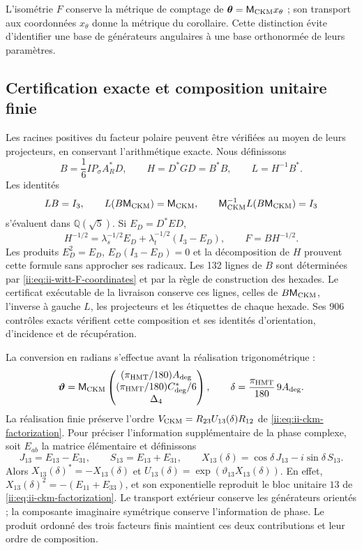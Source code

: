 L’isométrie \(F\) conserve la métrique de comptage de
\(\boldsymbol\theta=\mathsf M_{\rm CKM}x_\theta\) ; son transport
aux coordonnées \(x_\theta\) donne la métrique du corollaire. Cette
distinction évite d’identifier une base de générateurs angulaires à une
base orthonormée de leurs paramètres.

\subsection{Certification exacte et composition unitaire finie}

Les racines positives du facteur polaire peuvent être vérifiées au moyen de leurs
projecteurs, en conservant l’arithmétique exacte. Nous définissons
\begin{equation}
 B=\frac16IP_\sigma A_R^*D,\qquad
 H=D^*GD=B^*B,\qquad L=H^{-1}B^*.
 \label{ii:eq:ii-witt-radical-free}
\end{equation}
Les identités
\[
 LB=I_3,\qquad L(B\mathsf M_{\rm CKM})=\mathsf M_{\rm CKM},\qquad
 \mathsf M_{\rm CKM}^{-1}L(B\mathsf M_{\rm CKM})=I_3
\]
s’évaluent dans \(\mathbb Q(\sqrt5)\). Si \(E_D=D^*ED\),
\[
 H^{-1/2}=\lambda_s^{-1/2}E_D+
          \lambda_t^{-1/2}(I_3-E_D),\qquad F=BH^{-1/2}.
\]
Les produits \(E_D^2=E_D\), \(E_D(I_3-E_D)=0\) et la
décomposition de \(H\) prouvent cette formule sans approcher ses
radicaux. Les 132 lignes de \(B\) sont déterminées par
\eqref{ii:eq:ii-witt-F-coordinates} et par la règle de construction des
hexades. Le certificat exécutable de la livraison conserve ces lignes,
celles de \(B\mathsf M_{\rm CKM}\), l’inverse à gauche \(L\),
les projecteurs et les étiquettes de chaque hexade. Ses 906 contrôles
exacts vérifient cette composition et ses identités d’orientation,
d’incidence et de récupération.

La conversion en radians s’effectue avant la réalisation trigonométrique :
\begin{equation}
 \boldsymbol\vartheta=
 \mathsf M_{\rm CKM}
 \begin{pmatrix}(\pi_{\rm HMT}/180)A_{\rm deg}\\
 (\pi_{\rm HMT}/180)C^*_{\rm deg}/6\\\Delta_4\end{pmatrix},
 \qquad
 \delta=\frac{\pi_{\rm HMT}}{180}\,9A_{\rm deg}.
 \label{ii:eq:ii-witt-angular-units}
\end{equation}
La réalisation finie préserve l’ordre
\(V_{\rm CKM}=R_{23}U_{13}(\delta)R_{12}\) de
\eqref{ii:eq:ii-ckm-factorization}. Pour préciser l’information supplémentaire
de la phase complexe, soit \(E_{ab}\) la matrice élémentaire et définissons
\[
 J_{13}=E_{13}-E_{31},\qquad S_{13}=E_{13}+E_{31},\qquad
 X_{13}(\delta)=\cos\delta\,J_{13}-i\sin\delta\,S_{13}.
\]
Alors \(X_{13}(\delta)^*=-X_{13}(\delta)\) et
\(U_{13}(\delta)=\exp(\vartheta_{13}X_{13}(\delta))\).
En effet, \(X_{13}(\delta)^2=-(E_{11}+E_{33})\), et son exponentielle
reproduit le bloc unitaire \(13\) de
\eqref{ii:eq:ii-ckm-factorization}. Le transport extérieur conserve les
générateurs orientés ; la composante imaginaire symétrique conserve
l’information de phase. Le produit ordonné des trois facteurs
finis maintient ces deux contributions et leur ordre de composition.

